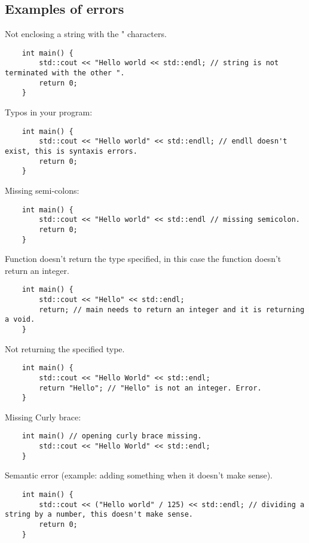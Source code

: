 \subsection{Examples of errors}
\noindent
Not enclosing a string with the " characters.
\begin{verbatim}
    int main() {
        std::cout << "Hello world << std::endl; // string is not terminated with the other ".
        return 0;
    }
\end{verbatim}
\noindent
Typos in your program: 
\begin{verbatim}
    int main() {
        std::cout << "Hello world" << std::endll; // endll doesn't exist, this is syntaxis errors.
        return 0;
    }
\end{verbatim}
\noindent
Missing semi-colons: 
\begin{verbatim}
    int main() {
        std::cout << "Hello world" << std::endl // missing semicolon. 
        return 0;
    }
\end{verbatim}
\noindent
Function doesn't return the type specified, in this case the function doesn't return an integer.
\begin{verbatim}
    int main() {
        std::cout << "Hello" << std::endl;
        return; // main needs to return an integer and it is returning a void.
    }
\end{verbatim}
\noindent
Not returning the specified type.
\begin{verbatim}
    int main() {
        std::cout << "Hello World" << std::endl;
        return "Hello"; // "Hello" is not an integer. Error.
    }
\end{verbatim}
\noindent
Missing Curly brace: 
\begin{verbatim}
    int main() // opening curly brace missing.
        std::cout << "Hello World" << std::endl;
    }
\end{verbatim}
\noindent
Semantic error (example: adding something when it doesn't make sense).
\begin{verbatim}
    int main() {
        std::cout << ("Hello world" / 125) << std::endl; // dividing a string by a number, this doesn't make sense.
        return 0;
    }
\end{verbatim}


